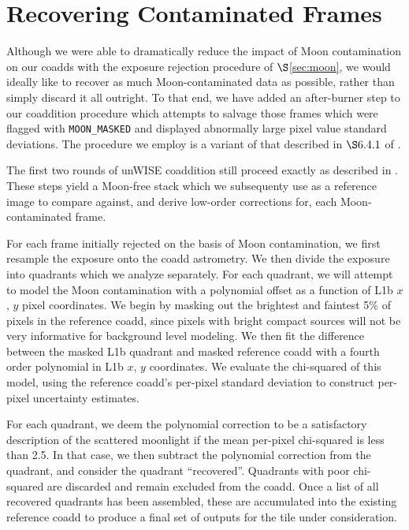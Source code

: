 \documentclass{emulateapj}
\begin{document}
\section{Recovering Contaminated Frames}
\label{sec:recover}

Although we were able to dramatically reduce the impact of Moon contamination
on our coadds with the exposure rejection procedure of $\S$\ref{sec:moon},
we would ideally like to recover as much Moon-contaminated data as possible,
rather than simply discard it all outright. To that end, we have added an 
after-burner step to our coaddition procedure which attempts to salvage those 
frames which were flagged with \verb|MOON_MASKED| and displayed abnormally 
large pixel value standard deviations. The procedure we employ is a variant of 
that described in $\S6.4.1$ of \cite{meisner14}.

The first two rounds of unWISE coaddition still proceed exactly as 
described in \cite{lang14}. These steps yield a Moon-free stack which we 
subsequenty use as a reference image to compare against, and derive low-order 
corrections for, each Moon-contaminated frame.

For each frame initially rejected on the basis of Moon contamination, we 
first resample the exposure onto the coadd astrometry. We then divide
the exposure into quadrants which we analyze separately. For each quadrant,
we will attempt to model the Moon contamination with a polynomial 
offset as a function of L1b $x$, $y$ pixel coordinates. We begin by masking out 
the brightest and faintest 5\% of pixels in the reference coadd, since pixels
with bright compact sources will not be very informative for background level
modeling. We then fit the difference between the masked L1b quadrant and masked
reference coadd with a fourth order polynomial in L1b $x$, $y$ coordinates. We 
evaluate the chi-squared of this model, using the reference coadd's per-pixel
standard deviation to construct per-pixel uncertainty estimates.

For each quadrant, we deem the polynomial correction to be a satisfactory 
description of the scattered moonlight if the mean per-pixel chi-squared is 
less than 2.5. In that case, we then subtract the polynomial correction from 
the quadrant, and consider the quadrant ``recovered''. Quadrants with poor 
chi-squared are discarded and remain excluded from the coadd. Once a list of 
all recovered quadrants has been assembled, these are accumulated into the 
existing reference coadd to produce a final set of outputs for the tile under 
consideration.
\end{document}
